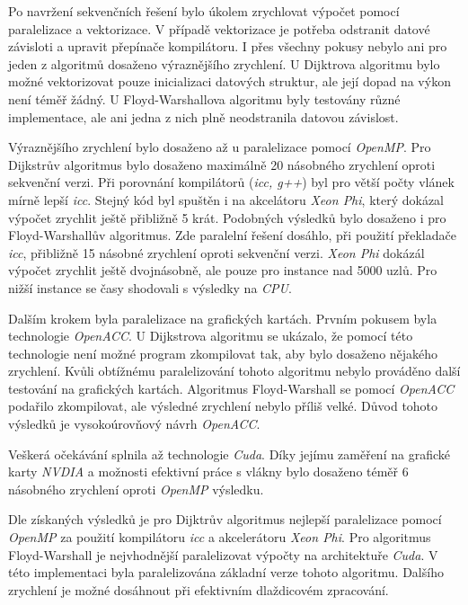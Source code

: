 \documentclass[a4paper,11pt]{article}
\begin{document}
     Po navržení sekvenčních řešení bylo úkolem zrychlovat výpočet pomocí paralelizace a vektorizace.
     V případě vektorizace je potřeba odstranit datové závisloti a upravit přepínače kompilátoru. I přes 
     všechny pokusy nebylo ani pro jeden z algoritmů dosaženo výraznějšího zrychlení. U Dijktrova algoritmu 
     bylo možné vektorizovat pouze inicializaci datových struktur, ale její dopad na výkon není téměř žádný. 
     U Floyd-Warshallova algoritmu byly testovány různé implementace, ale ani jedna z nich plně neodstranila 
     datovou závislost.
     
     Výraznějšího zrychlení bylo dosaženo až u paralelizace pomocí \textit{OpenMP}. Pro Dijkstrův algoritmus 
     bylo dosaženo maximálně 20 násobného zrychlení oproti sekvenční verzi. Při porovnání kompilátorů (\textit{icc, g++})
     byl pro větší počty vlánek mírně lepší \textit{icc}. Stejný kód byl spuštěn i na akcelátoru \textit{Xeon Phi}, který dokázal 
     výpočet zrychlit ještě přibližně 5 krát. Podobných výsledků bylo dosaženo i pro Floyd-Warshallův algoritmus.
     Zde paralelní řešení dosáhlo, při použití překladače \textit{icc}, přibližně 15 násobné zrychlení
     oproti sekvenční verzi. \textit{Xeon Phi} dokázál výpočet zrychlit ještě dvojnásobně, ale pouze pro instance 
     nad 5000 uzlů. Pro nižší instance se časy shodovali s výsledky na \textit{CPU}.
     
     Dalším krokem byla paralelizace na grafických kartách. Prvním pokusem byla technologie \textit{OpenACC}. 
     U Dijkstrova algoritmu se ukázalo, že pomocí této technologie není možné program zkompilovat tak, aby 
     bylo dosaženo nějakého zrychlení. Kvůli obtížnému paralelizování tohoto algoritmu nebylo prováděno 
     další testování na grafických kartách. Algoritmus Floyd-Warshall se pomocí \textit{OpenACC} podařilo zkompilovat, 
     ale výsledné zrychlení nebylo příliš velké. Důvod tohoto výsledků je vysokoúrovňový návrh \textit{OpenACC}.
     
     Veškerá očekávání splnila až technologie \textit{Cuda}. Díky jejímu zaměření na grafické karty \textit{NVDIA} a možnosti 
     efektivní práce s vlákny bylo dosaženo téměř 6 násobného zrychlení oproti \textit{OpenMP} výsledku.
     
     Dle získaných výsledků je pro Dijktrův algoritmus nejlepší paralelizace pomocí \textit{OpenMP} za použití
     kompilátoru \textit{icc} a akcelerátoru \textit{Xeon Phi}. Pro algoritmus Floyd-Warshall je nejvhodnější paralelizovat 
     výpočty na architektuře \textit{Cuda}. V této implementaci byla paralelizována základní verze tohoto algoritmu. 
     Dalšího zrychlení je možné dosáhnout při efektivním dlaždicovém zpracování.  
\end{document}
